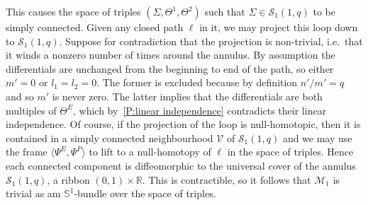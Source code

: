 \documentclass{article}
\numberwithin{equation}{section}
\numberwithin{figure}{section}
\newcommand{\R}{\mathbb{R}}
\renewcommand{\S}{\mathbb{S}}
\begin{document}
This causes the space of triples $(\Sigma,\Theta^1,\Theta^2)$ such that $\Sigma \in \mathcal{S}_1(1,q)$ to be simply connected. Given any closed path $\ell$ in it, we may project this loop down to $\mathcal{S}_1(1,q)$. 
Suppose for contradiction that the projection is non-trivial, i.e.\ that it winds a nonzero number of times around the annulus. By assumption the differentials are unchanged from the beginning to end of the path, so either $m' = 0$ or $l_1=l_2 = 0$. The former is excluded because by definition $n'/m' = q$ and so $m'$ is never zero. The latter implies that the differentials are both multiples of $\Theta^E$, which by~\ref{P:linear independence} contradicts their linear independence. 
Of course, if the projection of the loop is null-homotopic, then it is contained in a simply connected neighbourhood $\mathcal{V}$ of $\mathcal{S}_1(1,q)$ and we may use the frame $\langle \Psi^E,\Psi^P \rangle$ to lift to a null-homotopy of $\ell$ in the space of triples.
Hence each connected component is diffeomorphic to the universal cover of the annulus $\mathcal{S}_1(1,q)$, a ribbon $(0,1)\times \R$. This is contractible, so it follows that $\mathcal{M}_1$ is trivial as am $\S^1$-bundle over the space of triples. 
\end{document}

